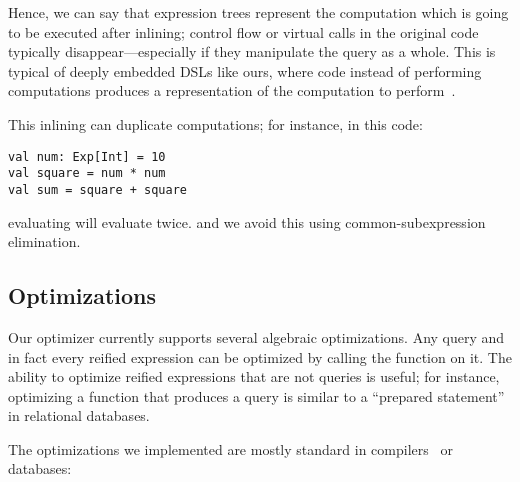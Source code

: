 Hence, we can say that expression trees represent the computation which is going to be executed
after inlining; control flow or virtual calls in the original code typically
disappear---especially if they manipulate the query as a whole.
This is typical of deeply embedded DSLs like ours, where code instead of performing
computations produces a representation of the computation to
perform~\citep{elliott03compiling, Chambers10}.

This inlining can duplicate computations; for instance, in this
code:
\begin{lstlisting}
val num: Exp[Int] = 10
val square = num * num
val sum = square + square
\end{lstlisting}
evaluating  will evaluate  twice.
\citet{elliott03compiling} and we avoid this using common-subexpression
elimination.

\subsection{Optimizations}

Our optimizer currently supports several algebraic optimizations.
Any query and in fact every reified expression can be optimized by calling the  function on it. The ability to optimize reified expressions that are not queries is
useful; for instance, optimizing a function that produces a query is similar to a ``prepared statement''
in relational databases.

The optimizations we implemented are mostly standard in compilers~\citep{DBLP:books/mk/Muchnick1997} or databases:

